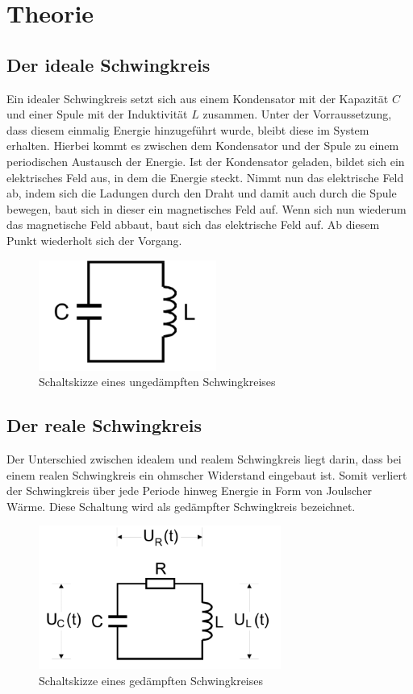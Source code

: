 \section{Theorie}
\label{sec:Theorie}

\subsection{Der ideale Schwingkreis}

Ein idealer Schwingkreis setzt sich aus einem Kondensator mit der Kapazität $C$ und einer 
Spule mit der Induktivität $L$ zusammen. Unter der Vorraussetzung, dass diesem einmalig Energie
hinzugeführt wurde, bleibt diese im System erhalten. Hierbei kommt es zwischen dem Kondensator 
und der Spule zu einem periodischen Austausch der Energie. 
Ist der Kondensator geladen, bildet sich ein elektrisches Feld aus, in dem die Energie 
steckt. Nimmt nun das elektrische Feld ab, indem sich die Ladungen durch den Draht 
und damit auch durch die Spule bewegen, baut sich in dieser ein magnetisches Feld auf. Wenn sich
nun wiederum das magnetische Feld abbaut, baut sich das elektrische Feld auf. Ab diesem Punkt
wiederholt sich der Vorgang.

\begin{figure}[H]
  \centering
  \includegraphics{content/UngedaempfterSchwingkreis.png}
  \caption{Schaltskizze eines ungedämpften Schwingkreises \cite{sample354}}
  \label{fig:ugsk}
\end{figure}



\subsection{Der reale Schwingkreis}

Der Unterschied zwischen idealem und realem Schwingkreis liegt darin, dass bei einem realen 
Schwingkreis ein ohmscher Widerstand eingebaut ist. Somit verliert der Schwingkreis über jede 
Periode hinweg Energie in Form von Joulscher Wärme. Diese Schaltung wird als gedämpfter 
Schwingkreis bezeichnet.

\begin{figure}[H]
  \centering
  \includegraphics{content/GedaempfterSchwingkreis.png}
  \caption{Schaltskizze eines gedämpften Schwingkreises \cite{sample354}}
  \label{fig:gsk}
\end{figure}

